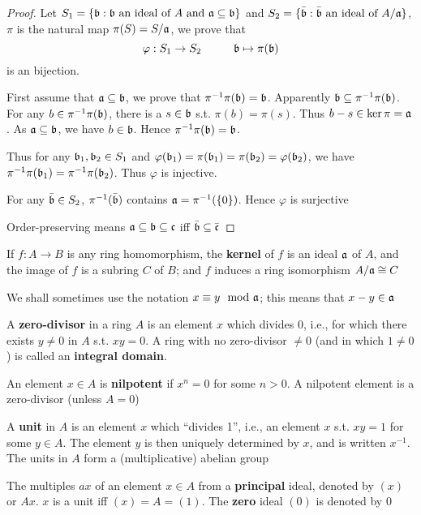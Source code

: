 \documentclass[11pt]{article}
\begin{document}
\begin{proof}
Let \(S_1=\{\mathfrak{b}:\mathfrak{b}\text{ an ideal of $A$ and }\mathfrak{a}\subseteq\mathfrak{b}\}\)
and \(S_2=\{\bar{\mathfrak{b}}:\bar{\mathfrak{b}}\text{ an ideal of }A/\mathfrak{a}\}\), \(\pi\) is the natural map \(\pi(S)=S/\mathfrak{a}\), we prove that
\begin{equation*}
\varphi:S_1\to S_2\hspace{1cm}\mathfrak{b}\mapsto\pi(\mathfrak{b})
\end{equation*}
is an bijection.

First assume that \(\mathfrak{a}\subseteq\mathfrak{b}\), we prove that \(\pi^{-1}\pi(\mathfrak{b})=\mathfrak{b}\). Apparently \(\mathfrak{b}\subseteq\pi^{-1}\pi(\mathfrak{b})\). For
any \(b\in\pi^{-1}\pi(\mathfrak{b})\), there is a \(s\in\mathfrak{b}\) s.t. \(\pi(b)=\pi(s)\). Thus \(b-s\in\ker\pi=\mathfrak{a}\). As \(\mathfrak{a}\subseteq\mathfrak{b}\),
we have \(b\in\mathfrak{b}\). Hence \(\pi^{-1}\pi(\mathfrak{b})=\mathfrak{b}\).

Thus for any \(\mathfrak{b}_1,\mathfrak{b}_2\in S_1\) and \(\varphi(\mathfrak{b}_1)=\pi(\mathfrak{b}_1)=\pi(\mathfrak{b}_2)=\varphi(\mathfrak{b}_2)\), we have \(\pi^{-1}\pi(\mathfrak{b}_1)=\pi^{-1}\pi(\mathfrak{b}_2)\).
Thus \(\varphi\) is injective.

For any \(\bar{\mathfrak{b}}\in S_2\), \(\pi^{-1}(\bar{\mathfrak{b}})\) contains \(\mathfrak{a}=\pi^{-1}(\{0\})\). Hence \(\varphi\) is surjective

Order-preserving means \(\mathfrak{a}\subseteq\mathfrak{b}\subseteq\mathfrak{c}\) iff \(\bar{\mathfrak{b}}\subseteq\bar{\mathfrak{c}}\)
\end{proof}

If \(f:A\to B\) is any ring homomorphism, the \textbf{kernel} of \(f\) is an ideal \(\mathfrak{a}\) of \(A\), and the
image of \(f\) is a subring \(C\) of \(B\); and \(f\) induces a ring isomorphism \(A/\mathfrak{a}\cong C\)

We shall sometimes use the notation \(x\equiv y\mod{\mathfrak{a}}\); this means that \(x-y\in\mathfrak{a}\)

A \textbf{zero-divisor} in a ring \(A\) is an element \(x\) which divides 0, i.e., for which there
exists \(y\neq 0\) in \(A\) s.t. \(xy=0\). A ring with no zero-divisor \(\neq 0\) (and in
which \(1\neq 0\)) is called an \textbf{integral domain}.

An element \(x\in A\) is \textbf{nilpotent} if \(x^n=0\) for some \(n>0\). A nilpotent element is a
zero-divisor (unless \(A=0\))

A \textbf{unit} in \(A\) is an element \(x\) which ``divides 1'', i.e., an element \(x\) s.t. \(xy=1\) for
some \(y\in A\). The element \(y\) is then uniquely determined by \(x\), and is
written \(x^{-1}\). The units in \(A\) form a (multiplicative) abelian group

The multiples \(ax\) of an element \(x\in A\) from a \textbf{principal} ideal, denoted by \((x)\)
or \(Ax\). \(x\) is a unit iff \((x)=A=(1)\). The \textbf{zero} ideal \((0)\) is denoted by 0
\end{document}
